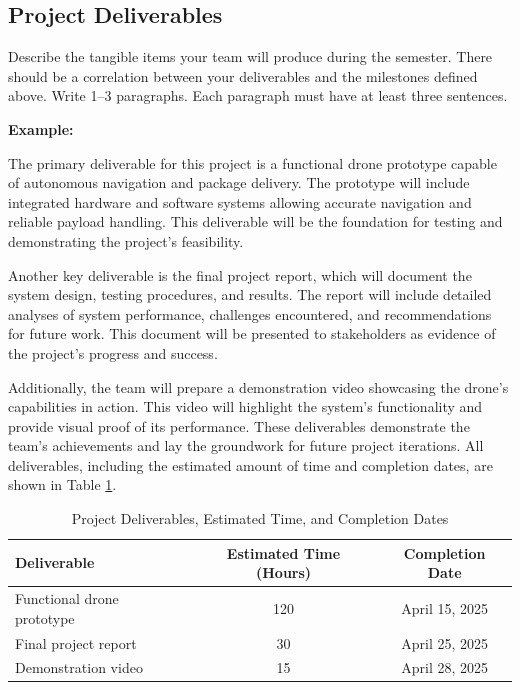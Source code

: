 \subsection{Project Deliverables}
Describe the tangible items your team will produce during the semester. There should be a correlation between your deliverables and the milestones defined above. Write 1–3 paragraphs. Each paragraph must have at least three sentences.

\textbf{Example:}

The primary deliverable for this project is a functional drone prototype capable of autonomous navigation and package delivery. The prototype will include integrated hardware and software systems allowing accurate navigation and reliable payload handling. This deliverable will be the foundation for testing and demonstrating the project's feasibility.

Another key deliverable is the final project report, which will document the system design, testing procedures, and results. The report will include detailed analyses of system performance, challenges encountered, and recommendations for future work. This document will be presented to stakeholders as evidence of the project's progress and success.

Additionally, the team will prepare a demonstration video showcasing the drone's capabilities in action. This video will highlight the system's functionality and provide visual proof of its performance. These deliverables demonstrate the team's achievements and lay the groundwork for future project iterations. All deliverables, including the estimated amount of time and completion dates, are shown in Table \ref{tab:deliverables}.

\begin{table}[ht!]
    \centering
    \begin{tabular}{|l|c|c|}
        \hline
        \textbf{Deliverable} & \textbf{Estimated Time (Hours)} & \textbf{Completion Date} \\ \hline
        Functional drone prototype & 120 & April 15, 2025 \\ \hline
        Final project report & 30 & April 25, 2025 \\ \hline
        Demonstration video & 15 & April 28, 2025 \\ \hline
    \end{tabular}
    \caption{Project Deliverables, Estimated Time, and Completion Dates}
    \label{tab:deliverables}
\end{table}

